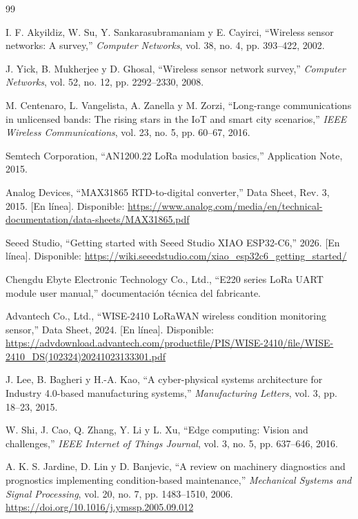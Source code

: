 \documentclass[conference]{IEEEtran}
\begin{document}
\begin{thebibliography}{99}

I. F. Akyildiz, W. Su, Y. Sankarasubramaniam y E. Cayirci, ``Wireless sensor networks: A survey,'' \textit{Computer Networks}, vol. 38, no. 4, pp. 393--422, 2002.

J. Yick, B. Mukherjee y D. Ghosal, ``Wireless sensor network survey,'' \textit{Computer Networks}, vol. 52, no. 12, pp. 2292--2330, 2008.

M. Centenaro, L. Vangelista, A. Zanella y M. Zorzi, ``Long-range communications in unlicensed bands: The rising stars in the IoT and smart city scenarios,'' \textit{IEEE Wireless Communications}, vol. 23, no. 5, pp. 60--67, 2016.

Semtech Corporation, ``AN1200.22 LoRa modulation basics,'' Application Note, 2015.

Analog Devices, ``MAX31865 RTD-to-digital converter,'' Data Sheet, Rev. 3, 2015. [En línea]. Disponible: \url{https://www.analog.com/media/en/technical-documentation/data-sheets/MAX31865.pdf}

Seeed Studio, ``Getting started with Seeed Studio XIAO ESP32-C6,'' 2026. [En línea]. Disponible: \url{https://wiki.seeedstudio.com/xiao_esp32c6_getting_started/}

Chengdu Ebyte Electronic Technology Co., Ltd., ``E220 series LoRa UART module user manual,'' documentación técnica del fabricante.

Advantech Co., Ltd., ``WISE-2410 LoRaWAN wireless condition monitoring sensor,'' Data Sheet, 2024. [En línea]. Disponible: \url{https://advdownload.advantech.com/productfile/PIS/WISE-2410/file/WISE-2410_DS(102324)20241023133301.pdf}

J. Lee, B. Bagheri y H.-A. Kao, ``A cyber-physical systems architecture for Industry 4.0-based manufacturing systems,'' \textit{Manufacturing Letters}, vol. 3, pp. 18--23, 2015.

W. Shi, J. Cao, Q. Zhang, Y. Li y L. Xu, ``Edge computing: Vision and challenges,'' \textit{IEEE Internet of Things Journal}, vol. 3, no. 5, pp. 637--646, 2016.

A. K. S. Jardine, D. Lin y D. Banjevic, ``A review on machinery diagnostics and prognostics implementing condition-based maintenance,'' \textit{Mechanical Systems and Signal Processing}, vol. 20, no. 7, pp. 1483--1510, 2006. \url{https://doi.org/10.1016/j.ymssp.2005.09.012}


\end{thebibliography}
\end{document}
